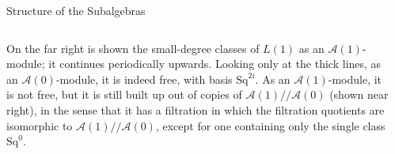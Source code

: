 \documentclass[final]{beamer}
\newcommand{\A}{\mathcal{A}}
\newcommand{\Sq}{\mathrm{Sq}}
\newcommand{\mm}{/\!/\!}
\begin{document}
\begin{columns}[T]
\begin{column}{0.495\textwidth}
\begin{section}{Structure of the Subalgebras}
\begin{columns}[T]
\begin{column}{0.66\textwidth}
{              On the far right is shown the small-degree classes of $L(1)$ as an $\A(1)$-module; it continues periodically upwards.  Looking only at the thick lines, as an $\A(0)$-module, it is indeed free, with basis $\Sq^{2i}$.  As an $\A(1)$-module, it is not free, but it is still built up out of copies of $\A(1)\mm\A(0)$ (shown near right), in the sense that it has a filtration in which the filtration quotients are isomorphic to $\A(1)\mm\A(0)$, except for one containing only the single class $\Sq^0$.
            }
          \end{column}
        \end{columns}
      \end{section}
    \end{column}
    \begin{column}{0.245\textwidth} %
      \vspace{1em}

\end{column}
\end{columns}
\end{document}
